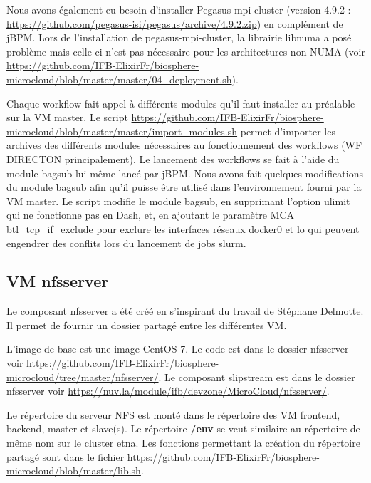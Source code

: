 Nous avons également eu besoin d'installer Pegasus-mpi-cluster (version 4.9.2 : \url{https://github.com/pegasus-isi/pegasus/archive/4.9.2.zip}) en complément de jBPM. Lors de l'installation de pegasus-mpi-cluster, la librairie libnuma a posé problème mais celle-ci n'est pas nécessaire pour les architectures non NUMA (voir \url{https://github.com/IFB-ElixirFr/biosphere-microcloud/blob/master/master/04_deployment.sh}).

\bigskip
Chaque workflow fait appel à différents modules qu'il faut installer au préalable sur la VM master. Le script \url{https://github.com/IFB-ElixirFr/biosphere-microcloud/blob/master/master/import_modules.sh} permet d'importer les archives des différents modules nécessaires au fonctionnement des workflows (WF DIRECTON principalement).
Le lancement des workflows se fait à l'aide du module bagsub lui-même lancé par jBPM. Nous avons fait quelques modifications du module bagsub afin qu'il puisse être utilisé dans l'environnement fourni par la VM master. Le script  modifie le module bagsub, en supprimant l'option ulimit qui ne fonctionne pas en Dash, et, en ajoutant le paramètre MCA btl\_tcp\_if\_exclude pour exclure les interfaces réseaux docker0 et lo qui peuvent engendrer des conflits lors du lancement de jobs slurm.


\subsection{VM nfsserver} \label{nfsserver}

Le composant nfsserver a été créé en s'inspirant du travail de Stéphane Delmotte.
Il permet de fournir un dossier partagé entre les différentes VM.

L'image de base est une image CentOS 7.
Le code est dans le dossier nfsserver voir  \url{https://github.com/IFB-ElixirFr/biosphere-microcloud/tree/master/nfsserver/}.
Le composant slipstream est dans le dossier nfsserver voir
\url{https://nuv.la/module/ifb/devzone/MicroCloud/nfsserver/}.

Le répertoire  du serveur NFS est monté dans le répertoire 
des VM frontend, backend, master et slave(s).
Le répertoire \textbf{/env} se veut similaire au répertoire de même nom sur le cluster etna. 
Les fonctions permettant la création du répertoire partagé sont dans le fichier \url{https://github.com/IFB-ElixirFr/biosphere-microcloud/blob/master/lib.sh}.

